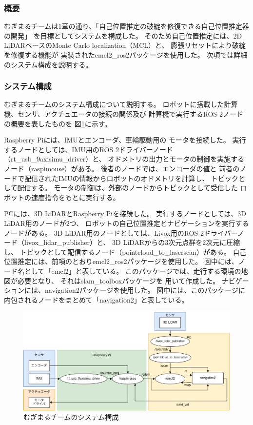 \subsubsection{概要}
むぎまるチームは1章の通り、「自己位置推定の破綻を修復できる自己位置推定器の開発」
を目標としてシステムを構成した。
そのため自己位置推定には、2D LiDARベースのMonte Carlo localization（MCL）\cite{fox1999etal}と、
膨張リセット\cite{ueda2004iros}により破綻を修復する機能が
実装されたemcl2\_ros2パッケージ\cite{emcl2_ros2}を使用した。
次項では詳細のシステム構成を説明する。
\subsubsection{システム構成}
むぎまるチームのシステム構成について説明する。
ロボットに搭載した計算機、センサ、アクチュエータの接続の関係及び
計算機で実行するROS 2ノードの概要を表したものを
図\ref{fig:mugimaru_system}に示す。

Raspberry Piには、IMUとエンコーダ、車輪駆動用の
モータを接続した。
実行するノードとしては、IMU用のROS 2ドライバーノード（rt\_usb\_9axisimu\_driver）と、
オドメトリの出力とモータの制御を実施するノード（raspimouse）がある。
後者のノードでは、エンコーダの値と
前者のノードで配信されたIMUの情報からロボットのオドメトリを計算し、
トピックとして配信する。
モータの制御は、外部のノードからトピックとして受信した
ロボットの速度指令をもとに実行する。

PCには、3D LiDARとRaspberry Piを接続した。
実行するノードとしては、3D LiDAR用のノードが2つ、
ロボットの自己位置推定とナビゲーションを実行するノードがある。
3D LiDAR用のノードとしては、Livox用のROS 2ドライバーノード（livox\_lidar\_publisher）と、
3D LiDARからの3次元点群を2次元に圧縮し、
トピックとして配信するノード（pointcloud\_to\_laserscan）がある。
自己位置推定には、前項のとおりemcl2\_ros2パッケージを使用した。
図中には、ノード名として「emcl2」と表している。
このパッケージでは、走行する環境の地図が必要となり、
それはslam\_toolboxパッケージ\cite{slam_toolbox}を
用いて作成した。
ナビゲーションには、navigation2パッケージ\cite{nav2}を使用した。
図中には、このパッケージに内包されるノードをまとめて「navigation2」と表している。

\begin{figure}[h]
  \begin{center}
    \includegraphics[width=1.0\linewidth]{figs/mugimaru_system_2024.eps}
    \caption{むぎまるチームのシステム構成}
    \label{fig:mugimaru_system}
  \end{center}
\end{figure}

